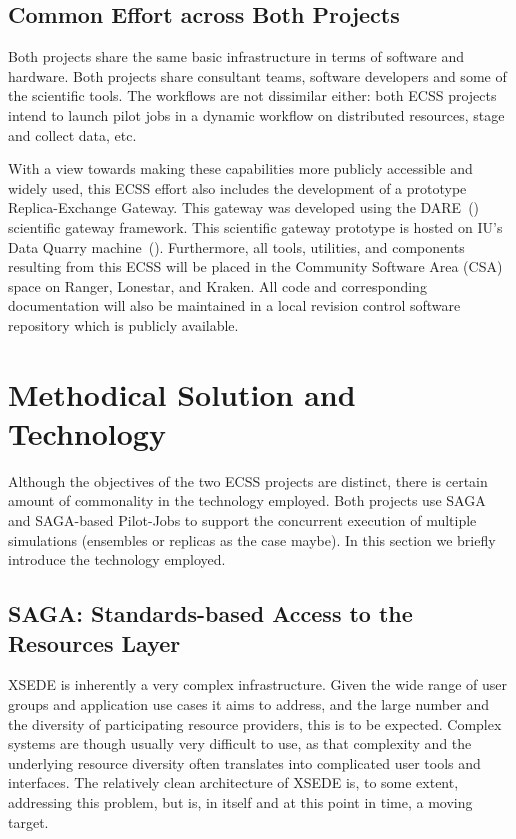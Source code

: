 \documentclass{sig-alternate}
\begin{document}
\subsection{Common Effort across Both Projects}

Both projects share the same basic infrastructure in terms of software and
hardware. Both projects share consultant teams, software developers and some of
the scientific tools. The workflows are not dissimilar either: both ECSS
projects intend to launch pilot jobs in a dynamic workflow on distributed
resources, stage and collect data, etc.

With a view towards making these capabilities more publicly accessible and
widely used, this ECSS effort also includes the development of a prototype
Replica-Exchange Gateway. This gateway was developed using the
DARE~(\cite{DARE})
scientific gateway framework. This scientific gateway prototype is hosted
on IU's Data Quarry machine~(\cite{DataQuarry}). Furthermore, all tools,
utilities, and components resulting from this ECSS will be placed in the Community 
Software Area (CSA) space on Ranger,
Lonestar, and Kraken. All code and corresponding documentation will also be
maintained in a local revision control software repository which is publicly
available.


\section{Methodical Solution and Technology}

Although the objectives of the two ECSS projects are distinct, there
is certain amount of commonality in the technology employed. Both
projects use SAGA and SAGA-based Pilot-Jobs to support the concurrent
execution of multiple simulations (ensembles or replicas as the case
maybe). In this section we briefly introduce the technology employed.

\subsection{SAGA: Standards-based Access to the Resources Layer}
\label{saga}
XSEDE is inherently a very complex infrastructure.  Given the wide
range of user groups and application use cases it aims to address,
and the large number and the diversity of participating resource
providers, this is to be expected.  Complex systems are though
usually very difficult to use, as that complexity and the underlying
resource diversity often translates into complicated user tools and
interfaces.  The relatively clean architecture of XSEDE is, to some
extent, addressing this problem, but is, in itself and at this point
in time, a moving target.
\end{document}
